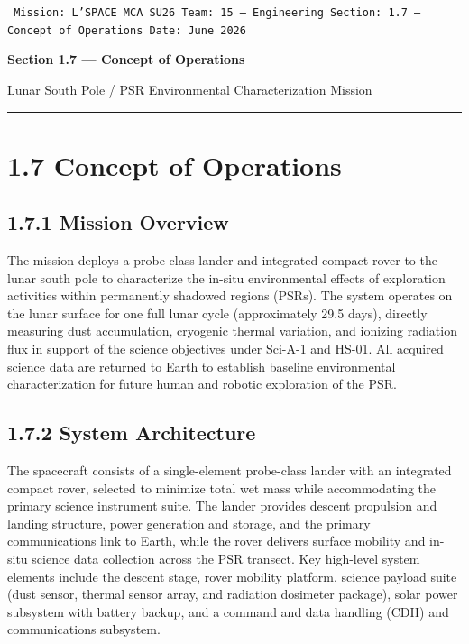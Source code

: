 \documentclass[11pt]{article}
\begin{document}
\vspace*{-6pt}
{\fontsize{8}{10}\selectfont\color{gray}\texttt{%
  Mission: L'SPACE MCA SU26 \quad Team: 15 — Engineering \quad
  Section: 1.7 — Concept of Operations \quad Date: June 2026}}
\vspace{4pt}

{\fontsize{18}{20}\selectfont\bfseries Section 1.7 — Concept of Operations}
\vspace{1pt}

{\small\color{gray} Lunar South Pole / PSR Environmental Characterization Mission}

\vspace{4pt}\noindent\rule{\textwidth}{1pt}\vspace{2pt}

\section{1.7 \quad Concept of Operations}

\subsection{1.7.1 \quad Mission Overview}

The mission deploys a probe-class lander and integrated compact rover to the lunar south pole to characterize the in-situ environmental effects of exploration activities within permanently shadowed regions (PSRs). The system operates on the lunar surface for one full lunar cycle (approximately 29.5 days), directly measuring dust accumulation, cryogenic thermal variation, and ionizing radiation flux in support of the science objectives under Sci-A-1 and HS-01. All acquired science data are returned to Earth to establish baseline environmental characterization for future human and robotic exploration of the PSR.

\vspace{4pt}
\subsection{1.7.2 \quad System Architecture}

The spacecraft consists of a single-element probe-class lander with an integrated compact rover, selected to minimize total wet mass while accommodating the primary science instrument suite. The lander provides descent propulsion and landing structure, power generation and storage, and the primary communications link to Earth, while the rover delivers surface mobility and in-situ science data collection across the PSR transect. Key high-level system elements include the descent stage, rover mobility platform, science payload suite (dust sensor, thermal sensor array, and radiation dosimeter package), solar power subsystem with battery backup, and a command and data handling (CDH) and communications subsystem.
\end{document}
